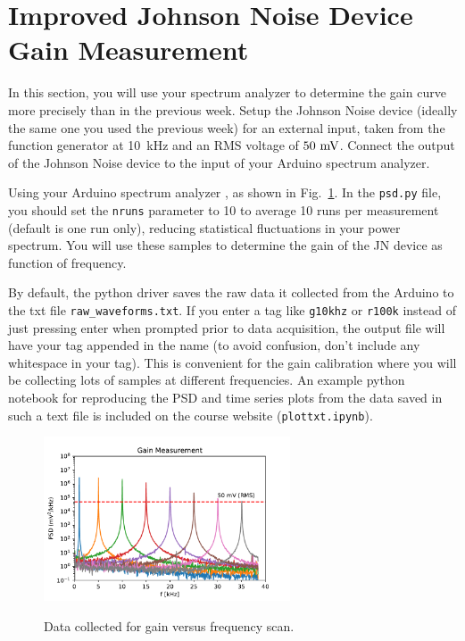 \documentclass[12pt]{article}
\begin{document}
\section{Improved Johnson Noise Device Gain Measurement}

In this section, you will use your spectrum analyzer to determine the gain curve more precisely than in the previous week.  Setup the Johnson Noise device (ideally the same one you used the previous week) for an external input, taken from the function generator at 10~\rm kHz and an RMS voltage of $50~\rm mV$.
Connect the output of the Johnson Noise device to the input of your Arduino spectrum analyzer.


Using your Arduino spectrum analyzer
, as shown in Fig.~\ref{fig:gain_raw}.  In the {\tt psd.py} file, you should set the {\tt nruns} parameter to 10 to average 10 runs per measurement (default is one run only), reducing statistical fluctuations in your power spectrum.  You will use these samples to determine the gain of the JN device as function of frequency.  

By default, the python driver saves the raw data it collected from the Arduino to the txt file {\tt raw\_waveforms.txt}.   If you enter a tag like {\tt g10khz} or {\tt r100k} instead of just pressing enter when prompted prior to data acquisition, the output file will have your tag appended in the name (to avoid confusion, don't include any whitespace in your tag).  This is convenient for the gain calibration where you will be collecting lots of samples at different frequencies.   An example python notebook for reproducing the PSD and time series plots from the data saved in such a text file is included on the course website ({\tt plottxt.ipynb}).

\begin{figure}[htbp]
\begin{center}
{\includegraphics[width=0.65\textwidth]{figs/gain_raw.pdf}}
\end{center}
\caption{\label{fig:gain_raw}  Data collected for gain versus frequency scan.}\end{figure}
\end{document}
